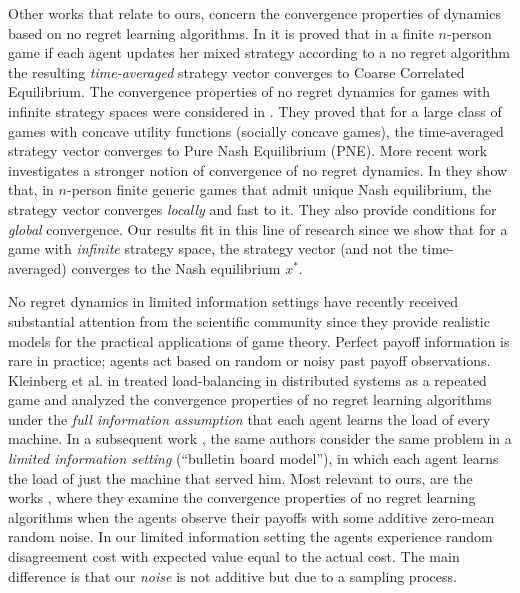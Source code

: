 Other works that relate to ours, concern the convergence properties of dynamics
based on no regret learning algorithms.  In \cite{FV97,FS99,SA00,SALS15} it is
proved that in a finite $n$-person game if each agent updates her mixed
strategy according to a no regret algorithm the resulting \emph{time-averaged}
strategy vector converges to Coarse Correlated Equilibrium. The convergence
properties of no regret dynamics for games with infinite strategy spaces were
considered in \cite{EMN09}.  They proved that for a large class of games with
concave utility functions (socially concave games), the time-averaged strategy
vector converges to Pure Nash Equilibrium (PNE). More recent work investigates
a stronger notion of convergence of no regret dynamics. In \cite{CHM17} they
show that, in $n$-person finite generic games that admit unique Nash
equilibrium, the strategy vector converges \emph{locally} and fast to it.  They
also provide conditions for \emph{global} convergence.  Our results fit in this
line of research since we show that for a game with \emph{infinite} strategy
space, the strategy vector (and not the time-averaged) converges to the Nash
equilibrium $x^*$.

No regret dynamics in limited information settings have recently received
substantial attention from the scientific community since they provide
realistic models for the practical applications of game theory.  Perfect payoff
information is rare in practice; agents act based on random or noisy past
payoff observations.  Kleinberg et al. in \cite{KPT09} treated load-balancing
in distributed systems as a repeated game and analyzed the convergence
properties of no regret learning algorithms under the \emph{full information
  assumption} that each agent learns the load of every machine.  In a
subsequent work \cite{KPT11}, the same authors consider the same problem in a
\emph{limited information setting} (\enquote{bulletin board model}), in which
each agent learns the load of just the machine that served him. Most relevant
to ours, are the works \cite{HCM17,MS17,BM17,CHM17}, where they examine the
convergence properties of no regret learning algorithms when the agents observe
their payoffs with some additive zero-mean random noise. In our limited
information setting the agents experience random disagreement cost with
expected value equal to the actual cost.  The main difference is that our
\emph{noise} is not additive but due to a sampling process.
